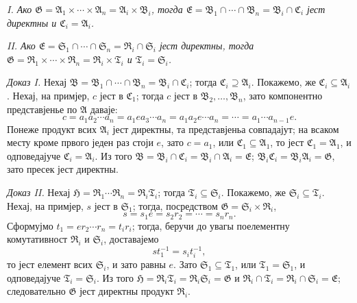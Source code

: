 ﻿\documentclass[11pt]{article}
\providecommand{\mG}{\mathfrak{G}}
\providecommand{\mA}{\mathfrak{A}}
\providecommand{\mB}{\mathfrak{B}}
\providecommand{\mE}{\mathfrak{E}}
\providecommand{\mH}{\mathfrak{H}}
\providecommand{\mC}{\mathfrak{C}}
\providecommand{\mR}{\mathfrak{R}}
\providecommand{\mS}{\mathfrak{S}}
\providecommand{\mT}{\mathfrak{T}}
\begin{document}
\emph{I. Ако $\mG=\mA_1\times\cdots\times\mA_n=\mA_i\times\mB_i$, тогда $\mE=\mB_1\cap\cdots\cap\mB_n=\mB_i\cap\mC_i$ јест директны и $\mC_i=\mA_i$.}

\emph{II. Ако $\mE=\mS_1\cap\cdots\cap\mS_n=\mR_i\cap\mS_i$ јест директны, тогда $\mG=\mR_1\times\cdots\times\mR_n=\mR_i\times\mT_i$ и $\mT_i=\mS_i$.}

\emph{Доказ I.} Нехај $\mB=\mB_1\cap\cdots\cap\mB_n=\mB_i\cap\mC_i$; тогда $\mC_i\supseteq\mA_i$. Покажемо, же $\mC_i\subseteq\mA_i$. Нехај, на примјер, $c$ јест в $\mC_1$; тогда $c$ јест в $\mB_2,\ldots,\mB_n$, зато компонентно представјенье по $\mA$ даваје:
\[
        c=a_1a_2\cdots a_n=a_1ea_3\cdots a_n=a_1a_2e\cdots a_n=\cdots=a_1\cdots a_{n-1}e.
\]
Понеже продукт всих $\mA_i$ јест директны, та представјеньа совпадајут; на всаком месту кроме првого једен раз стоји $e$, зато $c=a_1$, или $\mC_1\subseteq\mA_1$, то јест $\mC_1=\mA_1$, и одповедајуче $\mC_i=\mA_i$. Из того $\mB=\mB_i\cap\mC_i=\mB_i\cap\mA_i=\mE$; $\mB_i\mC_i=\mB_i\mA_i=\mG$, зато пресек јест директны.

\emph{Доказ II.} Нехај $\mH=\mR_1\cdots\mR_n=\mR_i\mT_i$; тогда $\mT_i\subseteq\mS_i$. Покажемо, же $\mS_i\subseteq\mT_i$. Нехај, на примјер, $s$ јест в $\mS_1$; тогда, посредством $\mG=\mS_i\times\mR_i$,
\[
        s=s_1e=s_2r_2=\cdots=s_nr_n.
\]
Сформујмо $t_1=er_2\cdots r_n=t_ir_i$; тогда, беручи до увагы поелементну комутативност $\mR_i$ и $\mS_i$, доставајемо
\[
        st_1^{-1}=s_it_i^{-1},
\]
то јест елемент всих $\mS_i$, и зато равны $e$. Зато $\mS_1\subseteq\mT_1$, или $\mT_1=\mS_1$, и одповедајуче $\mT_i=\mS_i$. Из того $\mH=\mR_i\mT_i=\mR_i\mS_i=\mG$ и $\mR_i\cap\mT_i=\mR_i\cap\mS_i=\mE$; следовательно $\mG$ јест директны продукт $\mR_i$.
\end{document}
